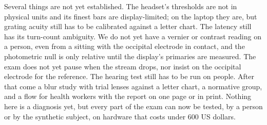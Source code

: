 \documentclass[conference]{IEEEtran}
\begin{document}
Several things are not yet established. The headset's thresholds are not in physical units and its finest bars are display-limited; on the laptop they are, but grating acuity still has to be calibrated against a letter chart. The latency still has its turn-count ambiguity. We do not yet have a vernier or contrast reading on a person, even from a sitting with the occipital electrode in contact, and the photometric null is only relative until the display's primaries are measured. The exam does not yet pause when the stream drops, nor insist on the occipital electrode for the reference. The hearing test still has to be run on people. After that come a blur study with trial lenses against a letter chart, a normative group, and a flow for health workers with the report on one page or in print. Nothing here is a diagnosis yet, but every part of the exam can now be tested, by a person or by the synthetic subject, on hardware that costs under 600 US dollars.



\end{document}
